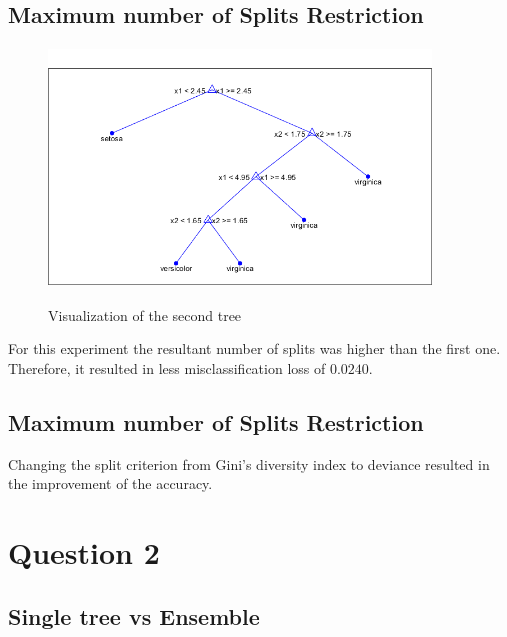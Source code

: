 \documentclass[11pt]{extarticle}
\begin{document}
\subsection{Maximum number of Splits Restriction}
\vspace*{-.5cm}
\begin{center}
    \begin{figure}[h]
        {\includegraphics[width = 4in, height = 2.5in]{QT_maxsplit.png}}
        \caption{Visualization of the second tree}
        \label{fig:q1_tree_split}
    \end{figure}
\end{center}
\vspace*{-1cm}
For this experiment the resultant number of splits was higher than the first one. Therefore, it resulted in less misclassification loss of $0.0240$.

\subsection{Maximum number of Splits Restriction}

Changing the split criterion from Gini's diversity index to deviance resulted in the improvement of the accuracy.

\section{Question 2}

\subsection{Single tree vs Ensemble}
\end{document}
